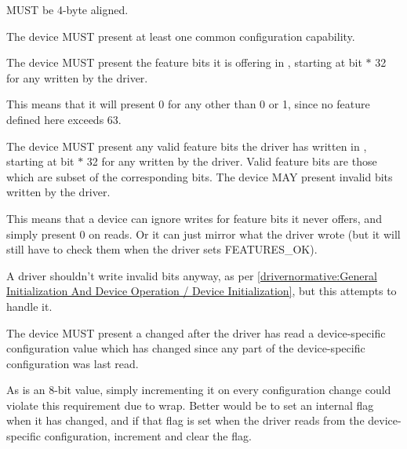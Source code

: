  MUST be 4-byte aligned.

The device MUST present at least one common configuration capability.

The device MUST present the feature bits it is offering in , starting at bit  $*$ 32 for any  written by the driver.
\begin{note}
  This means that it will present 0 for any  other than 0 or 1, since no feature defined here exceeds 63.
\end{note}

The device MUST present any valid feature bits the driver has written in , starting at bit  $*$ 32 for any  written by the driver.  Valid feature bits are those which are subset of the corresponding  bits.  The device MAY present invalid bits written by the driver.

\begin{note}
  This means that a device can ignore writes for feature bits it never
  offers, and simply present 0 on reads.  Or it can just mirror what the driver wrote
  (but it will still have to check them when the driver sets FEATURES_OK).
\end{note}

\begin{note}
  A driver shouldn't write invalid bits anyway, as per \ref{drivernormative:General Initialization And Device Operation / Device Initialization}, but this attempts to handle it.
\end{note}

The device MUST present a changed  after the
driver has read a device-specific configuration value which has
changed since any part of the device-specific configuration was last
read.
\begin{note}
As  is an 8-bit value, simply incrementing it
on every configuration change could violate this requirement due to wrap.
Better would be to set an internal flag when it has changed,
and if that flag is set when the driver reads from the device-specific
configuration, increment  and clear the flag.
\end{note}

